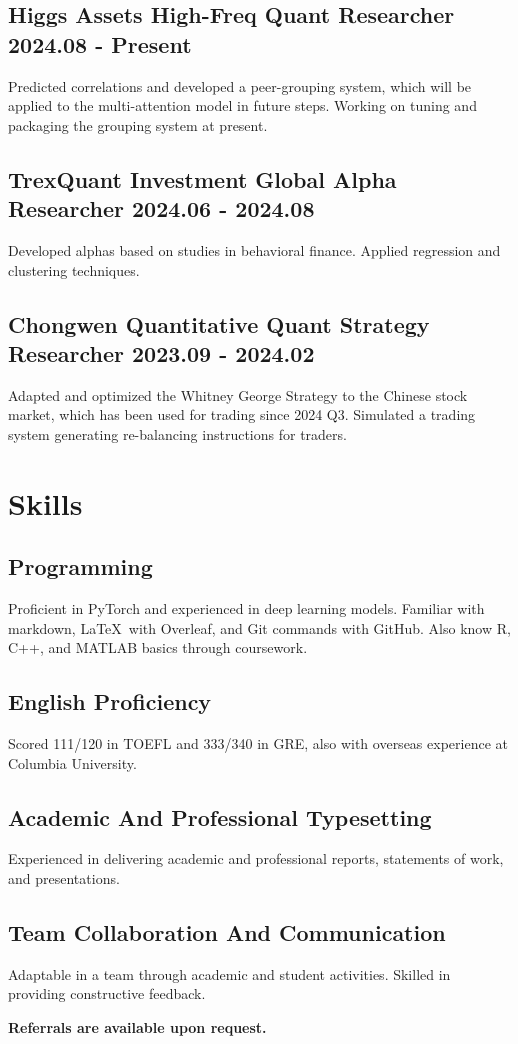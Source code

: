 \documentclass[a4paper]{article}
\begin{document}
\subsection{Higgs Assets \normalfont \hfill High-Freq Quant Researcher \hspace{70pt} 2024.08 - Present}
Predicted correlations and developed a peer-grouping system, which will be applied to the multi-attention model in future steps. Working on tuning and packaging the grouping system at present.
\subsection{TrexQuant Investment \normalfont \hfill Global Alpha Researcher \hspace{70pt} 2024.06 - 2024.08}
Developed alphas based on studies in behavioral finance. Applied regression and clustering techniques.
\subsection{Chongwen Quantitative \normalfont\hfill Quant Strategy Researcher  \hspace{70pt} 2023.09 - 2024.02}
Adapted and optimized the Whitney George Strategy to the Chinese stock market, which has been used for trading since 2024 Q3. Simulated a trading system generating re-balancing instructions for traders.

\section{Skills}

\subsection{Programming}
Proficient in PyTorch and experienced in deep learning models. Familiar with markdown, \LaTeX\ with Overleaf, and Git commands with  GitHub. Also know R, C++, and MATLAB basics through coursework.

\subsection{English Proficiency}
Scored 111/120 in TOEFL and 333/340 in GRE, also with overseas experience at Columbia University. 

\subsection{Academic And Professional Typesetting}
Experienced in delivering academic and professional reports, statements of work, and presentations.

\subsection{Team Collaboration And Communication}
Adaptable in a team through academic and student activities. Skilled in providing constructive feedback.

\vfill
\begin{center}
    \textbf{Referrals are available upon request.}
\end{center}
\end{document}
